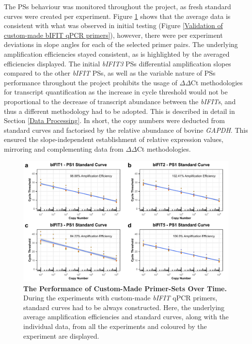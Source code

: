 The PSs behaviour was monitored throughout the project, as fresh standard curves were created per experiment. Figure \ref{The Performance of Custom-Made Primer-Sets Over Time} shows that the average data is consistent with what was observed in initial testing (Figure \ref{Validation of custom-made bIFIT qPCR primers}), however, there were per experiment deviations in slope angles for each of the selected primer pairs. The underlying amplification efficiencies stayed consistent, as is highlighted by the averaged efficiencies displayed. The initial \textit{bIFIT3} PSs differential amplification slopes compared to the other \textit{bIFIT} PSs, as well as the variable nature of PSs performance throughout the project prohibits the usage of \(\Delta\)\(\Delta\)Ct methodologies for transcript quantification as the increase in cycle threshold would not be proportional to the decrease of transcript abundance between the \textit{bIFITs}, and thus a different methodology had to be adopted. This is described in detail in Section \ref{Data Processing}. In short, the copy numbers were deducted from standard curves and factorised by the relative abundance of bovine \textit{GAPDH}. This ensured the slope-independent establishment of relative expression values, mirroring and complementing data from \(\Delta\)\(\Delta\)Ct methodologies.

\begin{figure}
    \centering
    \includegraphics[width=1\linewidth]{07. Chapter 2/Figs/01. Technologies/03. standard curves behaviour.pdf}
    \caption[The Performance of Custom-Made Primer-Sets Over Time.]{\textbf{The Performance of Custom-Made Primer-Sets Over Time.} During the experiments with custom-made \textit{bIFIT} qPCR primers, standard curves had to be always constructed. Here, the underlying average amplification efficiencies and standard curves, along with the individual data, from all the experiments and coloured by the experiment are displayed.}
    \label{The Performance of Custom-Made Primer-Sets Over Time}
\end{figure}

